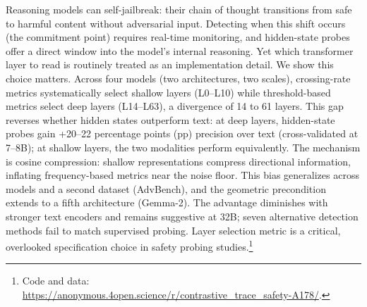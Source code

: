 Reasoning models can self-jailbreak: their chain of thought transitions from safe to harmful content without adversarial input. Detecting when this shift occurs (the commitment point) requires real-time monitoring, and hidden-state probes offer a direct window into the model's internal reasoning. Yet which transformer layer to read is routinely treated as an implementation detail. We show this choice matters. Across four models (two architectures, two scales), crossing-rate metrics systematically select shallow layers (L0--L10) while threshold-based metrics select deep layers (L14--L63), a divergence of 14 to 61 layers. This gap reverses whether hidden states outperform text: at deep layers, hidden-state probes gain +20--22 percentage points (pp) precision over text (cross-validated at 7--8B); at shallow layers, the two modalities perform equivalently. The mechanism is cosine compression: shallow representations compress directional information, inflating frequency-based metrics near the noise floor. This bias generalizes across models and a second dataset (AdvBench), and the geometric precondition extends to a fifth architecture (Gemma-2). The advantage diminishes with stronger text encoders and remains suggestive at 32B; seven alternative detection methods fail to match supervised probing. Layer selection metric is a critical, overlooked specification choice in safety probing studies.\footnote{Code and data: \url{https://anonymous.4open.science/r/contrastive_trace_safety-A178/}.}
